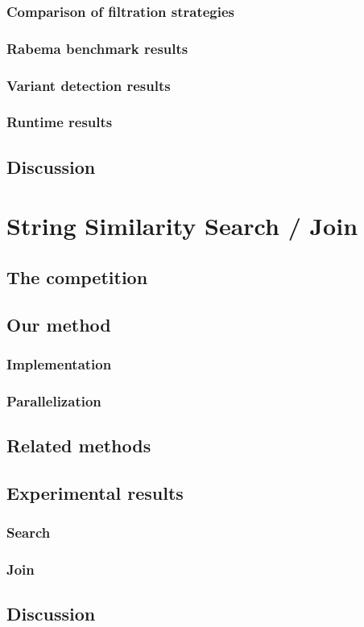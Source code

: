 \subsection{Comparison of filtration strategies}
\subsection{Rabema benchmark results}
\subsection{Variant detection results}
\subsection{Runtime results}
\section{Discussion}

\chapter{String Similarity Search / Join}
\section{The competition}
\section{Our method}
\subsection{Implementation}
\subsection{Parallelization}
\section{Related methods}
\section{Experimental results}
\subsection{Search}
\subsection{Join}
\section{Discussion}
